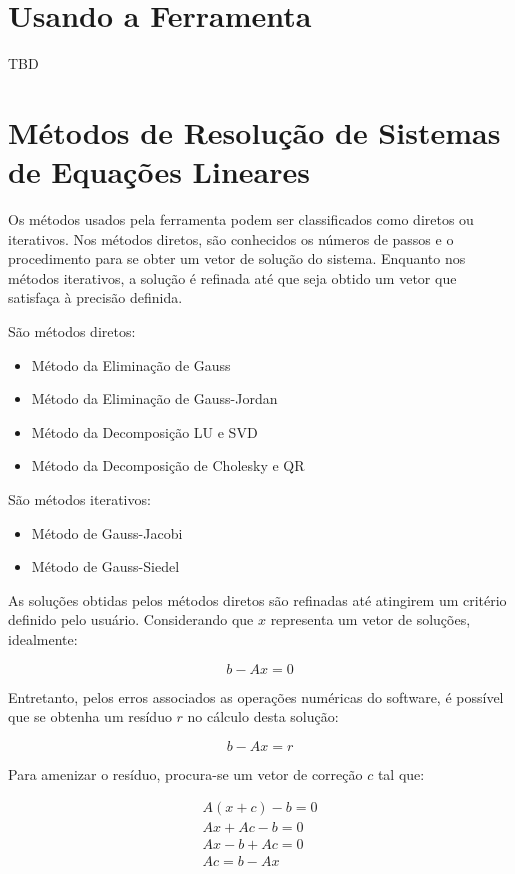 \documentclass[a4paper,10pt]{report}
\begin{document}
\section{Usando a Ferramenta}

TBD

\section{Métodos de Resolução de Sistemas de Equações Lineares}

Os métodos usados pela ferramenta podem ser classificados como diretos ou iterativos. Nos métodos diretos, são conhecidos os números de passos e o procedimento para se obter um vetor de solução do sistema. Enquanto nos métodos iterativos, a solução é refinada até que seja obtido um vetor que satisfaça à precisão definida.

São métodos diretos:
\begin{itemize}
 \item Método da Eliminação de Gauss
 \item Método da Eliminação de Gauss-Jordan
 \item Método da Decomposição LU e SVD
 \item Método da Decomposição de Cholesky e QR
\end{itemize}

São métodos iterativos:
\begin{itemize}
 \item Método de Gauss-Jacobi
 \item Método de Gauss-Siedel
\end{itemize}

As soluções obtidas pelos métodos diretos são refinadas até atingirem um critério definido pelo usuário. Considerando que $x$ representa um vetor de soluções, idealmente:

\[
b - Ax = 0
\]

Entretanto, pelos erros associados as operações numéricas do software, é possível que se obtenha um resíduo $r$ no cálculo desta solução:

\begin{equation}
b - Ax = r
\label{residuo}
\end{equation}

Para amenizar o resíduo, procura-se um vetor de correção $c$ tal que:

\[
\begin{array}{c}
A(x+c) - b = 0 \\
Ax + Ac - b = 0 \\
Ax - b + Ac = 0 \\
Ac = b - Ax \\
\end{array}
\]
\end{document}
